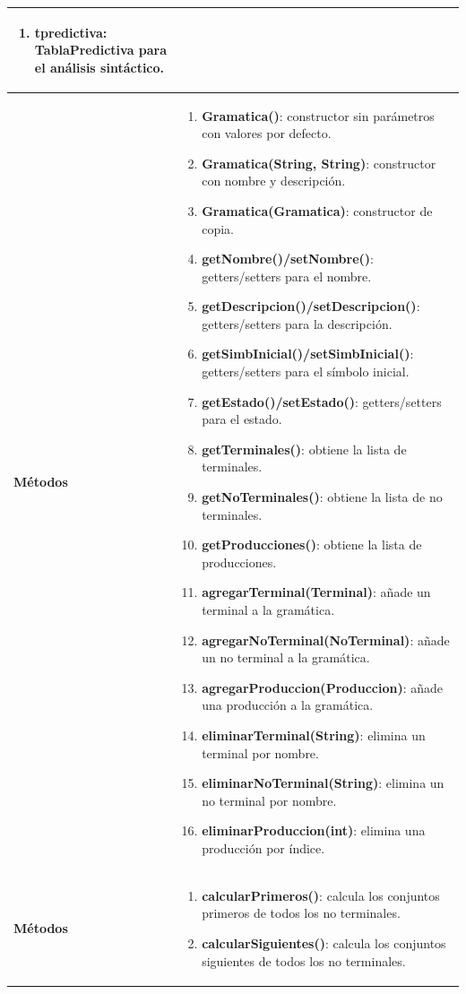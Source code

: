 \begin{longtable}[H]{|>{\columncolor[rgb]{0.63,0.79,0.95}}m{6cm} | m{8.5cm} |}
\begin{enumerate}
    \item \textbf{tpredictiva}: TablaPredictiva para el análisis sintáctico.
\end{enumerate} \\ \hline
\textbf{Métodos} &
\begin{enumerate}
    \item \textbf{Gramatica()}: constructor sin parámetros con valores por defecto.
    \item \textbf{Gramatica(String, String)}: constructor con nombre y descripción.
    \item \textbf{Gramatica(Gramatica)}: constructor de copia.
    \item \textbf{getNombre()/setNombre()}: getters/setters para el nombre.
    \item \textbf{getDescripcion()/setDescripcion()}: getters/setters para la descripción.
    \item \textbf{getSimbInicial()/setSimbInicial()}: getters/setters para el símbolo inicial.
    \item \textbf{getEstado()/setEstado()}: getters/setters para el estado.
    \item \textbf{getTerminales()}: obtiene la lista de terminales.
    \item \textbf{getNoTerminales()}: obtiene la lista de no terminales.
    \item \textbf{getProducciones()}: obtiene la lista de producciones.
    \item \textbf{agregarTerminal(Terminal)}: añade un terminal a la gramática.
    \item \textbf{agregarNoTerminal(NoTerminal)}: añade un no terminal a la gramática.
    \item \textbf{agregarProduccion(Produccion)}: añade una producción a la gramática.
    \item \textbf{eliminarTerminal(String)}: elimina un terminal por nombre.
    \item \textbf{eliminarNoTerminal(String)}: elimina un no terminal por nombre.
    \item \textbf{eliminarProduccion(int)}: elimina una producción por índice.
\end{enumerate} \\ \hline
\textbf{Métodos} &
\begin{enumerate}
    \item \textbf{calcularPrimeros()}: calcula los conjuntos primeros de todos los no terminales.
    \item \textbf{calcularSiguientes()}: calcula los conjuntos siguientes de todos los no terminales.

\end{enumerate}
\end{longtable}

